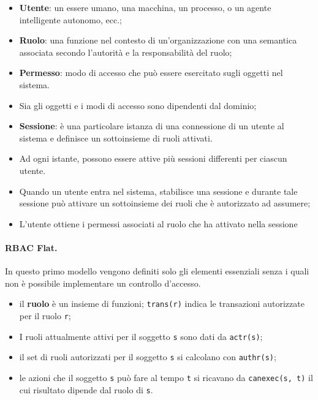 \begin{itemize}
    \item \textbf{Utente}: un essere umano, una macchina, un processo, o un
          agente intelligente autonomo, ecc.;
    \item \textbf{Ruolo}: una funzione nel contesto di un'organizzazione con
          una semantica associata
          secondo l'autorità e la responsabilità del ruolo;
    \item \textbf{Permesso}: modo di accesso che può essere esercitato sugli
          oggetti nel sistema.
    \item Sia gli oggetti e i modi di accesso sono dipendenti dal dominio;
    \item \textbf{Sessione}: è una particolare istanza di una connessione di
          un utente al sistema e definisce
          un sottoinsieme di ruoli attivati.
    \item Ad ogni istante, possono essere attive più sessioni differenti per
          ciascun utente.
    \item Quando un utente entra nel sistema, stabilisce una sessione e durante
          tale sessione può
          attivare un sottoinsieme dei ruoli che è autorizzato ad assumere;
    \item L'utente ottiene i permessi associati al ruolo che ha attivato nella
          sessione
\end{itemize}

\paragraph{RBAC Flat.}

In questo primo modello vengono definiti solo gli elementi essenziali senza i
quali non è possibile implementare un controllo d'accesso.

\begin{itemize}
    \item il \textbf{ruolo} è un insieme di funzioni; \verb|trans(r)|
          indica le transazioni autorizzate per il ruolo \verb|r|;
    \item I ruoli attualmente attivi per il soggetto \verb|s| sono dati da
          \verb|actr(s)|;
    \item il set di ruoli autorizzati per il soggetto \verb|s| si calcolano
          con \verb|authr(s)|;
    \item le azioni che il soggetto \verb|s| può fare al tempo \verb|t| si
          ricavano da \verb|canexec(s, t)| il cui risultato
          dipende dal ruolo di \verb|s|.
\end{itemize}

